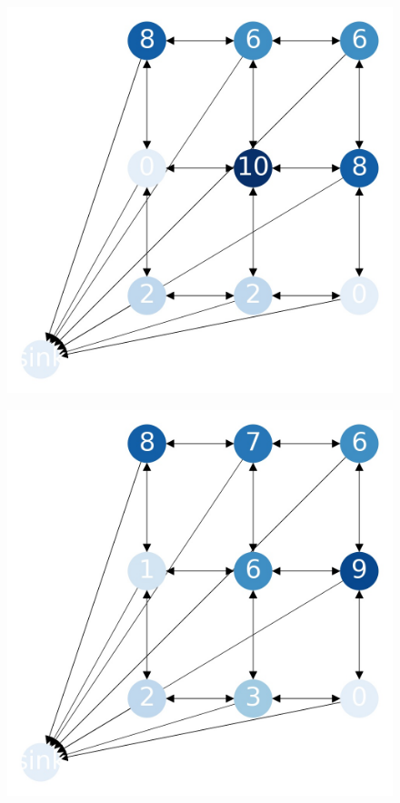 \documentclass{beamer}
\begin{document}
\begin{frame}
  \begin{figure}[h!]
    \centering
      \includegraphics[scale=0.25]{sandpile_8}
  \end{figure}
\end{frame}


\begin{frame}
  \begin{figure}[h!]
    \centering
      \includegraphics[scale=0.25]{sandpile_9}
  \end{figure}
\end{frame}
\end{document}
